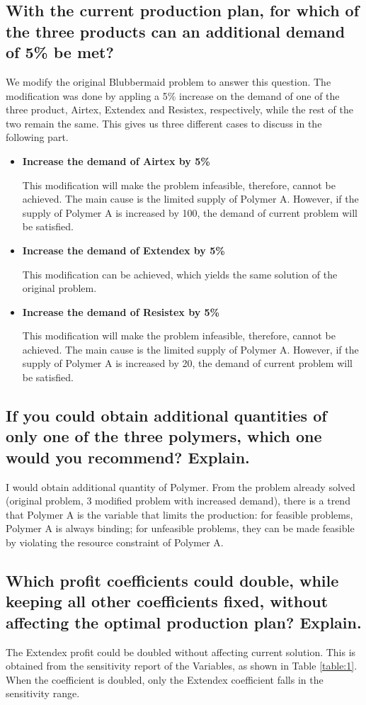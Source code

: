 \documentclass[11pt]{article}
\begin{document}
\subsection{With the current production plan, for which of the three products can an additional demand of 5\% be met?}
We modify the original Blubbermaid problem to answer this question. The modification was done by appling a 5\% increase on the demand of one of the three product, Airtex, Extendex and Resistex, respectively, while the rest of the two remain the same. This gives us three different cases to discuss in the following part.
\begin{itemize}
    \item \textbf{Increase the demand of Airtex by 5\%} \par
    This modification will make the problem infeasible, therefore, cannot be achieved. The main cause is the limited supply of Polymer A. However, if the supply of Polymer A is increased by 100, the demand of current problem will be satisfied.
    \item \textbf{Increase the demand of Extendex by 5\%} \par
    This modification can be achieved, which yields the same solution of the original problem.
    \item \textbf{Increase the demand of Resistex by 5\%} \par
    This modification will make the problem infeasible, therefore, cannot be achieved. The main cause is the limited supply of Polymer A. However, if the supply of Polymer A is increased by 20, the demand of current problem will be satisfied.
\end{itemize}

\subsection{If you could obtain additional quantities of only one of the three polymers, which one would you recommend? Explain.}
I would obtain additional quantity of Polymer. From the problem already solved (original problem, 3 modified problem with increased demand), there is a trend that Polymer A is the variable that limits the production: for feasible problems, Polymer A is always binding; for unfeasible problems, they can be made feasible by violating the resource constraint of Polymer A.
\subsection{Which profit coefficients could double, while keeping all other coefficients fixed, without affecting the optimal production plan? Explain.}
The Extendex profit could be doubled without affecting current solution. This is obtained from the sensitivity report of the Variables, as shown in Table \ref{table:1}. When the coefficient is doubled, only the Extendex coefficient falls in the sensitivity range.
\end{document}
